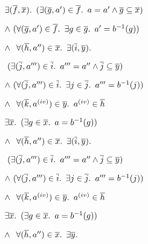 \begin{itemize}
  \step[\iffs]
    $\exists (\overline{f},\overline{x})\ldotp~(\exists(\overline{g},a^\prime)\in\overline{f}\ldotp~a=a^\prime\land\overline{g}\subseteq\overline{x})$
    \marginnote{\Def-$\App$}

  \addtolength{\itemsep}{-.2\baselineskip}
  \step
    \quad $\land~(\forall (\overline{g},a^\prime)\in\overline{f}\ldotp~\exists g\in\overline{g}\ldotp~a^\prime = b^{-1}(g))$

  \step
    \quad $\land~\phantom{(}\forall(\overline{h},a^{\prime\prime})\in\overline{x}\ldotp~\exists(\overline{i},\overline{y})\ldotp$

  \step
    \quad\quad\quad\phantom{$\land$}$~(\exists (\overline{j},a^{\prime\prime\prime})\in\overline{i}\ldotp~a^{\prime\prime\prime} = a^{\prime\prime}\land\overline{j}\subseteq\overline{y})$
    \marginnote{\Def-$\App$}

  \step
    \quad\quad\quad$\land~(\forall (\overline{j},a^{\prime\prime\prime})\in\overline{i}\ldotp~\exists j\in\overline{j}\ldotp~a^{\prime\prime\prime}=b^{-1}(j))$

  \step
    \quad\quad\quad$\land~\phantom{(}\forall (\overline{k},a^{\text (iv)})\in\overline{y}\ldotp~a^{\text (iv)}\in\overline{h}$
  \addtolength{\itemsep}{.2\baselineskip}

  \step[\iffs]
    $\exists \overline{x}\ldotp~(\exists g\in\overline{x}\ldotp~a = b^{-1}(g))$

  \addtolength{\itemsep}{-.2\baselineskip}
  \step
    \quad $\land~\phantom{(}\forall(\overline{h},a^{\prime\prime})\in\overline{x}\ldotp~\exists(\overline{i},\overline{y})\ldotp$

  \step
    \quad\quad\quad\phantom{$\land$}$~(\exists (\overline{j},a^{\prime\prime\prime})\in\overline{i}\ldotp~a^{\prime\prime\prime} = a^{\prime\prime}\land\overline{j}\subseteq\overline{y})$

  \step
    \quad\quad\quad$\land~(\forall (\overline{j},a^{\prime\prime\prime})\in\overline{i}\ldotp~\exists j\in\overline{j}\ldotp~a^{\prime\prime\prime}=b^{-1}(j))$

  \step
    \quad\quad\quad$\land~\phantom{(}\forall (\overline{k},a^{\text (iv)})\in\overline{y}\ldotp~a^{\text (iv)}\in\overline{h}$
  \addtolength{\itemsep}{.2\baselineskip}

  \step[\iffs]
    $\exists \overline{x}\ldotp~(\exists g\in\overline{x}\ldotp~a = b^{-1}(g))$

  \addtolength{\itemsep}{-.2\baselineskip}
  \step
    \quad $\land~\phantom{(}\forall(\overline{h},a^{\prime\prime})\in\overline{x}\ldotp~\exists\overline{y}\ldotp$


\end{itemize}
